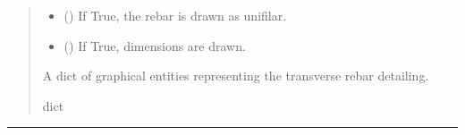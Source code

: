 \documentclass[a4paper,10pt,english]{sphinxmanual}
\begin{document}
\begin{fulllineitems}
\begin{fulllineitems}
\begin{quote}
\begin{description}
\begin{itemize}
\item {} 
\sphinxAtStartPar
{} () \textendash{} If True, the rebar is drawn as unifilar.

\item {} 
\sphinxAtStartPar
{} () \textendash{} If True, dimensions are drawn.

\end{itemize}

\sphinxAtStartPar
A dict of graphical entities representing the transverse rebar detailing.

\sphinxAtStartPar
dict

\end{description}\end{quote}

\end{fulllineitems}


\end{fulllineitems}



\bigskip\hrule\bigskip

\label{\detokenize{API:module-etacad.column}}
\end{document}
